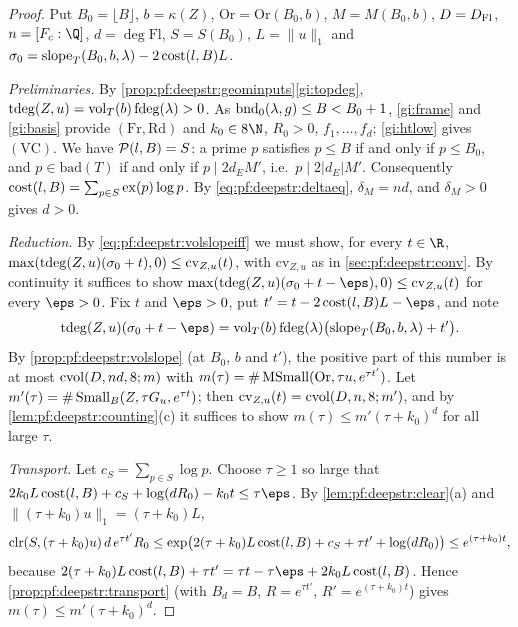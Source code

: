 \begin{proof}
Put $B_0=\lfloor B\rfloor$, $b=\kappa(Z)$, $\mathrm{Or}=\mathrm{Or}(B_0,b)$, $M=M(B_0,b)$, $D=D_{\mathrm{Fl}}$, $n=[F_c:\Q]$,
$d=\deg\mathrm{Fl}$, $S=S(B_0)$, $L=\|u\|_1$ and $\sigma_0=\operatorname{slope}_T(B_0,b,\lambda)-2\operatorname{cost}(l,B)L$.

\emph{Preliminaries.} By \cref{prop:pf:deepstr:geominputs}\ref{gi:topdeg}, $\operatorname{tdeg}(Z,u)=\operatorname{vol}_T(b)\operatorname{fdeg}(\lambda)>0$.
As $\operatorname{bnd}_0(\lambda,g)\le B<B_0+1$, \ref{gi:frame} and \ref{gi:basis} provide $(\mathrm{Fr},\mathrm{Rd})$ and $k_0\in8\N$,
$R_0>0$, $f_1,\dots,f_d$; \ref{gi:htlow} gives $\mathrm{(VC)}$. We have $\mathcal{P}(l,B)=S$: a prime $p$
satisfies $p\le B$ if and only if $p\le B_0$, and $p\in\mathrm{bad}(T)$ if and only if $p\mid2d_EM'$, i.e.\ $p\mid2|d_E|M'$.
Consequently $\operatorname{cost}(l,B)=\sum_{p\in S}\operatorname{ex}(p)\log p$. By \eqref{eq:pf:deepstr:deltaeq}, $\delta_M=nd$, and
$\delta_M>0$ gives $d>0$.

\emph{Reduction.} By \eqref{eq:pf:deepstr:volslopeiff} we must show, for every $t\in\R$,
$\max(\operatorname{tdeg}(Z,u)(\sigma_0+t),0)\le\mathrm{cv}_{Z,u}(t)$, with $\mathrm{cv}_{Z,u}$ as in
\cref{sec:pf:deepstr:conv}. By continuity it suffices to show
$\max(\deepstrtop(Z,u)(\sigma_0+t-\eps),0)\le\mathrm{cv}_{Z,u}(t)$ for every $\eps>0$. Fix $t$ and $\eps>0$, put
$t'=t-2\deepstrcost(l,B)L-\eps$, and note
\[
\deepstrtop(Z,u)(\sigma_0+t-\eps)=\deepstrvol_T(b)\deepstrflagdeg(\lambda)\bigl(\deepstrslope_T(B_0,b,\lambda)+t'\bigr).
\]
By \cref{prop:pf:deepstr:volslope} (at $B_0$, $b$ and $t'$), the positive part of this number is at most
$\operatorname{cvol}(D,nd,8;m)$ with $m(\tau)=\#\operatorname{MSmall}(\mathrm{Or},\tau u,e^{\tau t'})$. Let
$m'(\tau)=\#\operatorname{Small}_B(Z,\tau G_u,e^{\tau t})$; then $\mathrm{cv}_{Z,u}(t)=\operatorname{cvol}(D,n,8;m')$, and by
\cref{lem:pf:deepstr:counting}(c) it suffices to show $m(\tau)\le m'(\tau+k_0)^d$ for all large $\tau$.

\emph{Transport.} Let $c_S=\sum_{p\in S}\log p$. Choose $\tau\ge1$ so large that
$2k_0L\deepstrcost(l,B)+c_S+\log(dR_0)-k_0t\le\tau\eps$. By \cref{lem:pf:deepstr:clear}(a) and $\|(\tau+k_0)u\|_1=(\tau+k_0)L$,
\[
\operatorname{clr}(S,(\tau+k_0)u)\,d\,e^{\tau t'}R_0\le\exp\bigl(2(\tau+k_0)L\operatorname{cost}(l,B)+c_S+\tau t'+\log(dR_0)\bigr)
\le e^{(\tau+k_0)t},
\]
because $2(\tau+k_0)L\deepstrcost(l,B)+\tau t'=\tau t-\tau\eps+2k_0L\deepstrcost(l,B)$. Hence
\cref{prop:pf:deepstr:transport} (with $B_d=B$, $R=e^{\tau t'}$, $R'=e^{(\tau+k_0)t}$) gives $m(\tau)\le m'(\tau+k_0)^d$.
\end{proof}

